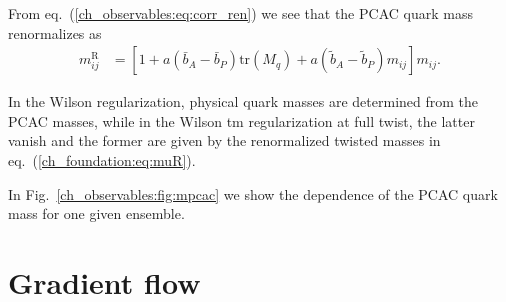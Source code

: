 From eq.~(\ref{ch_observables:eq:corr_ren}) we see that the PCAC quark mass renormalizes as
\begin{align}
m_{ij}^{\textrm{R}}&=\left[1+a\left(\bar{b}_A-\bar{b}_P\right){\textrm{tr}}\left(M_q\right)+a\left(\tilde{b}_A-\tilde{b}_P\right)m_{ij}\right]m_{ij}.
\end{align}

In the Wilson regularization, physical quark masses are determined from the PCAC masses, while in the Wilson tm regularization at full twist, the latter vanish and the former are given by the renormalized twisted masses in eq.~(\ref{ch_foundation:eq:muR}).

In Fig.~\ref{ch_observables:fig:mpcac} we show the dependence of the PCAC quark mass for one given ensemble.


\section{Gradient flow}
\label{ch_observables:sec:Flow}

